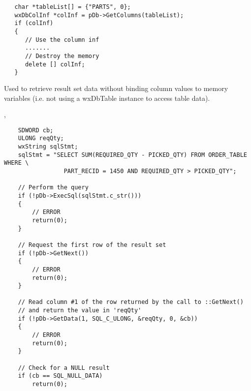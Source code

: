 
\begin{verbatim}
   char *tableList[] = {"PARTS", 0};
   wxDbColInf *colInf = pDb->GetColumns(tableList);
   if (colInf)
   {
      // Use the column inf
      .......
      // Destroy the memory
      delete [] colInf;
   }
\end{verbatim}


\label{wxdbgetdata}


Used to retrieve result set data without binding column values to memory variables (i.e. not using a wxDbTable instance to access table data).




, 


\begin{verbatim}
    SDWORD cb;
    ULONG reqQty;
    wxString sqlStmt;
    sqlStmt = "SELECT SUM(REQUIRED_QTY - PICKED_QTY) FROM ORDER_TABLE WHERE \
                 PART_RECID = 1450 AND REQUIRED_QTY > PICKED_QTY";

    // Perform the query
    if (!pDb->ExecSql(sqlStmt.c_str()))
    {
        // ERROR
        return(0);
    }

    // Request the first row of the result set
    if (!pDb->GetNext())
    {
        // ERROR
        return(0);
    }

    // Read column #1 of the row returned by the call to ::GetNext() 
    // and return the value in 'reqQty'
    if (!pDb->GetData(1, SQL_C_ULONG, &reqQty, 0, &cb))
    {
        // ERROR
        return(0);
    }

    // Check for a NULL result
    if (cb == SQL_NULL_DATA)
        return(0);
\end{verbatim}

